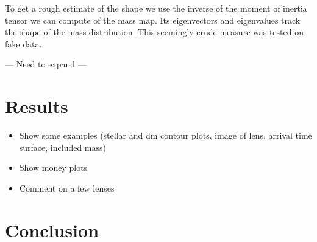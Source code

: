 \documentclass[10pt]{article}
\begin{document}
To get a rough estimate of the shape we use the inverse of the moment of inertia tensor we can compute of the mass map. Its eigenvectors and eigenvalues track the shape of the mass distribution. This seemingly crude measure was tested on fake data.

--- Need to expand ---


\section{Results}
\begin{itemize}
\item Show some examples (stellar and dm contour plots, image of lens, arrival time surface, included mass)
\item Show money plots
\item Comment on a few lenses
\end{itemize}



\section{Conclusion}


\nocite{*}
\end{document}
